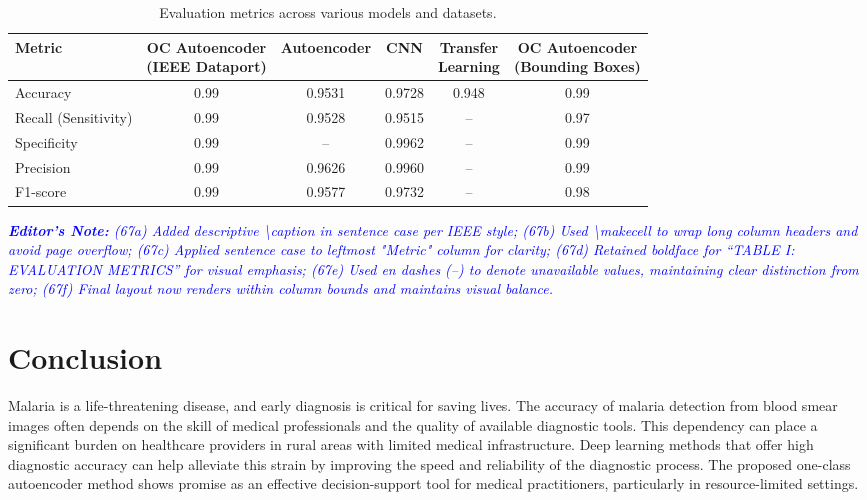 \documentclass[journal,12pt,onecolumn,draftcls]{IEEEtran}
\newcommand{\editornote}[1]{\par\textit{\textcolor{blue}{\textbf{Editor's Note:} #1}}\par}
\begin{document}
\begin{table}[H]
  \caption{Evaluation metrics across various models and datasets.}
  \label{table:eval_metrics}
  \centering
  \begin{tabular}{l|c|c|c|c|c}
    \hline
    \textbf{Metric} &
    \makecell[c]{OC Autoencoder\\(IEEE Dataport)} &
    \textbf{Autoencoder} &
    \textbf{CNN} &
    \makecell[c]{Transfer\\Learning} &
    \makecell[c]{OC Autoencoder\\(Bounding Boxes)} \\
    \hline
    Accuracy & 0.99 & 0.9531 & 0.9728 & 0.948 & 0.99 \\
    Recall (Sensitivity) & 0.99 & 0.9528 & 0.9515 & -- & 0.97 \\
    Specificity & 0.99 & -- & 0.9962 & -- & 0.99 \\
    Precision & 0.99 & 0.9626 & 0.9960 & -- & 0.99 \\
    F1-score & 0.99 & 0.9577 & 0.9732 & -- & 0.98 \\
    \hline
  \end{tabular}
\end{table}

\editornote{
(67a) Added descriptive \textbackslash caption in sentence case per IEEE style;
(67b) Used \textbackslash makecell to wrap long column headers and avoid page overflow;
(67c) Applied sentence case to leftmost "Metric" column for clarity;
(67d) Retained boldface for “TABLE I: EVALUATION METRICS” for visual emphasis;
(67e) Used en dashes (–) to denote unavailable values, maintaining clear distinction from zero;
(67f) Final layout now renders within column bounds and maintains visual balance.
}

\section{Conclusion}
Malaria is a life-threatening disease, and early diagnosis is critical for saving lives. The accuracy of malaria detection from blood smear images often depends on the skill of medical professionals and the quality of available diagnostic tools. This dependency can place a significant burden on healthcare providers in rural areas with limited medical infrastructure. Deep learning methods that offer high diagnostic accuracy can help alleviate this strain by improving the speed and reliability of the diagnostic process. The proposed one-class autoencoder method shows promise as an effective decision-support tool for medical practitioners, particularly in resource-limited settings.
\end{document}
